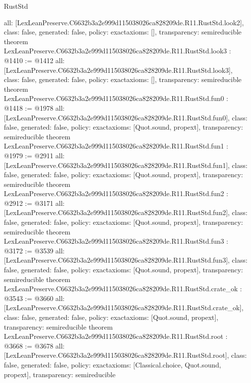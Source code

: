 \begin{lexlean}{RustStd}
\begin{coremodule}
{  all: [LexLeanPreserve.C6632b3a2e999d115038026ca828209de.R11.RustStd.look2],
  class: false,
  generated: false,
  policy: exact{axioms: []},
  transparency: semireducible
}
theorem LexLeanPreserve.C6632b3a2e999d115038026ca828209de.R11.RustStd.look3 : @1410 := @1412 {
  all: [LexLeanPreserve.C6632b3a2e999d115038026ca828209de.R11.RustStd.look3],
  class: false,
  generated: false,
  policy: exact{axioms: []},
  transparency: semireducible
}
theorem LexLeanPreserve.C6632b3a2e999d115038026ca828209de.R11.RustStd.fun0 : @1418 := @1978 {
  all: [LexLeanPreserve.C6632b3a2e999d115038026ca828209de.R11.RustStd.fun0],
  class: false,
  generated: false,
  policy: exact{axioms: [Quot.sound, propext]},
  transparency: semireducible
}
theorem LexLeanPreserve.C6632b3a2e999d115038026ca828209de.R11.RustStd.fun1 : @1979 := @2911 {
  all: [LexLeanPreserve.C6632b3a2e999d115038026ca828209de.R11.RustStd.fun1],
  class: false,
  generated: false,
  policy: exact{axioms: [Quot.sound, propext]},
  transparency: semireducible
}
theorem LexLeanPreserve.C6632b3a2e999d115038026ca828209de.R11.RustStd.fun2 : @2912 := @3171 {
  all: [LexLeanPreserve.C6632b3a2e999d115038026ca828209de.R11.RustStd.fun2],
  class: false,
  generated: false,
  policy: exact{axioms: [Quot.sound, propext]},
  transparency: semireducible
}
theorem LexLeanPreserve.C6632b3a2e999d115038026ca828209de.R11.RustStd.fun3 : @3172 := @3539 {
  all: [LexLeanPreserve.C6632b3a2e999d115038026ca828209de.R11.RustStd.fun3],
  class: false,
  generated: false,
  policy: exact{axioms: [Quot.sound, propext]},
  transparency: semireducible
}
theorem LexLeanPreserve.C6632b3a2e999d115038026ca828209de.R11.RustStd.crate_ok : @3543 := @3660 {
  all: [LexLeanPreserve.C6632b3a2e999d115038026ca828209de.R11.RustStd.crate_ok],
  class: false,
  generated: false,
  policy: exact{axioms: [Quot.sound, propext]},
  transparency: semireducible
}
theorem LexLeanPreserve.C6632b3a2e999d115038026ca828209de.R11.RustStd.root : @3668 := @3678 {
  all: [LexLeanPreserve.C6632b3a2e999d115038026ca828209de.R11.RustStd.root],
  class: false,
  generated: false,
  policy: exact{axioms: [Classical.choice, Quot.sound, propext]},
  transparency: semireducible
}


\end{coremodule}
\end{lexlean}
